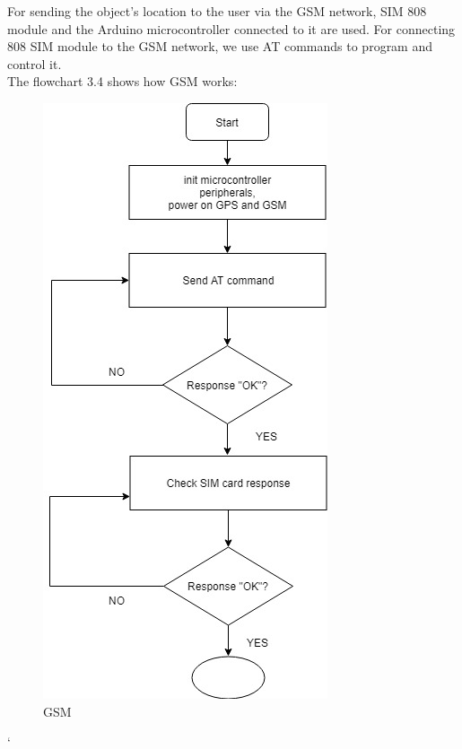 For sending the object's location to the user via the GSM network, SIM 808 module and the Arduino microcontroller connected to it are used. For connecting 808 SIM module to the GSM network, we use AT commands to program and control it.\\
\newpage
The flowchart 3.4 shows how GSM works:\\
\begin{figure}[!h]
	\centerline{\includegraphics[width=.6\textwidth]{gsm-flowchart}}
	\caption{GSM \cite{8}}
\end{figure}
\newpage`
